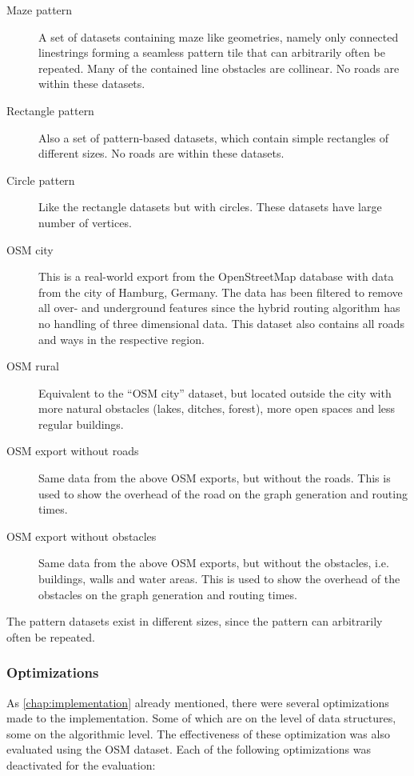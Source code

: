			\begin{description}
				\item[Maze pattern] A set of datasets containing maze like geometries, namely only connected linestrings forming a seamless pattern tile that can arbitrarily often be repeated. Many of the contained line obstacles are collinear. No roads are within these datasets.
				\item[Rectangle pattern] Also a set of pattern-based datasets, which contain simple rectangles of different sizes. No roads are within these datasets.
				\item[Circle pattern] Like the rectangle datasets but with circles. These datasets have large number of vertices.
				\item[OSM city] This is a real-world export from the OpenStreetMap database with data from the city of Hamburg, Germany. The data has been filtered to remove all over- and underground features since the hybrid routing algorithm has no handling of three dimensional data. This dataset also contains all roads and ways in the respective region.
				\item[OSM rural] Equivalent to the \enquote{OSM city} dataset, but located outside the city with more natural obstacles (lakes, ditches, forest), more open spaces and less regular buildings.
				\item[OSM export without roads] Same data from the above OSM exports, but without the roads. This is used to show the overhead of the road on the graph generation and routing times.
				\item[OSM export without obstacles] Same data from the above OSM exports, but without the obstacles, i.e. buildings, walls and water areas. This is used to show the overhead of the obstacles on the graph generation and routing times.
			\end{description}
			
			The pattern datasets exist in different sizes, since the pattern can arbitrarily often be repeated.
			
			
		
		\subsubsection{Optimizations}
		
			As \cref{chap:implementation} already mentioned, there were several optimizations made to the implementation.
			Some of which are on the level of data structures, some on the algorithmic level.
			The effectiveness of these optimization was also evaluated using the OSM dataset.
			Each of the following optimizations was deactivated for the evaluation:

